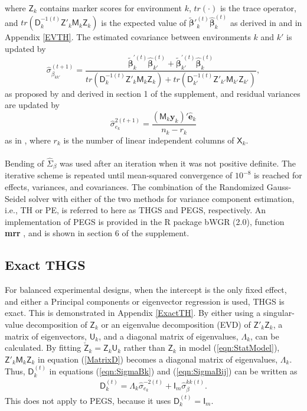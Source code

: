 \documentclass{bmcart}
\newcommand{\vecx}{\boldsymbol}
\newcommand{\mat}[1]{\boldsymbol{\mathsf{#1}}}
\begin{document}
where $\mat{Z}_k$ contains marker scores for environment $k$, $tr(\cdot)$ is the trace operator, and $tr(\mat{D}^{-1(t)}_k \mat{Z}'_k \mat{M}_{k} \mat{Z}_k)$ is the expected value of $\tilde{\vecx{\beta}}'^{(t)}_k\hat{\vecx{\beta}}^{(t)}_k$ as derived in \cite{VanRaden} and in Appendix \ref{EVTH}. The 
estimated covariance between environments $k$ and $k'$ is updated by
\begin{equation}
\label{eqn:SigmaBij}
\hat{\sigma}^{(t+1)}_{\beta_{kk'}} = \frac{\tilde{\vecx{\beta}}^{'(t)}_k\hat{\vecx{\beta}}^{(t)}_{k'} + \tilde{\vecx{\beta}}^{'(t)}_{k'}\hat{\vecx{\beta}}^{(t)}_k}{tr(\mat{D}^{-1(t)}_k \mat{Z}'_k \mat{M}_{k} \mat{Z}_k)+tr(\mat{D}^{-1(t)}_{k'} \mat{Z}'_{k'} \mat{M}_{k'} \mat{Z}_{k'})},
\end{equation}
as proposed by \cite{Schaeffer} and derived in section 1 of the supplement, and residual variances are updated by
\begin{equation}
\label{eqn:SigmaEk}
\hat{\sigma}^{2(t+1)}_{e_k} = 
\frac{(\mat{M}_{k}\vecx{y}_k)'\hat{\vecx{e}}_k}{n_k-r_k}
\end{equation}
as in \cite{GSRU}, where $r_k$ is the number of linear independent columns of $\mat{X}_k$.
\\\\
Bending  \cite{bend0} of $\hat{\Sigma}_{\beta}$ was used after an iteration when it was not positive definite. The iterative scheme is repeated until mean-squared convergence of $10^{-8}$ is reached for effects, variances, and covariances. The combination of the Randomized Gauss-Seidel solver with either of the two methods for variance component estimation, i.e., TH or PE, is referred to here as THGS and PEGS, respectively. An implementation of PEGS is provided in the R package bWGR (2.0), function \textbf{mrr} \cite{bWGR}, and is shown in section 6 of the supplement.

\subsection{Exact THGS}

For balanced experimental designs, when the intercept is the only fixed effect, and either a Principal components \cite{StatLearn} or eigenvector regression \cite{RKHS2010, svd2018, Xavier2021} is used, THGS is exact. This is demonstrated in Appendix \ref{ExactTH}. By either using a singular-value decomposition of $\mat{Z}_k$ or an eigenvalue decomposition (EVD) of $\mat{Z}'_k\mat{Z}_k$, a matrix of eigenvectors, $\mat{U}_k$, and a diagonal matrix of eigenvalues, $\mat{\Lambda}_k$, can be calculated. By fitting $\check{\mat{Z}}_k = \mat{Z}_k\mat{U}_k$  rather than $\mat{Z}_k$ in model (\ref{eqn:StatModel}), $\mat{Z}'_k\mat{M}_k\mat{Z}_k$ in equation (\ref{MatrixD})
becomes a diagonal matrix of eigenvalues, $\mat{\Lambda}_k$. Thus, $\mat{D}^{(t)}_k$ in equations (\ref{eqn:SigmaBk}) and (\ref{eqn:SigmaBij}) can be written as
\begin{align}\label{UNBIASEDTHGS}
 \mat{D}^{(t)}_k = \mat{\Lambda}_k\hat{\sigma}^{-2(t)}_{e_k}+\mat{I}_m\hat{\sigma}^{kk(t)}_{\beta}.
\end{align}
This does not apply to PEGS, because it uses $\mat{D}^{(t)}_k = \mat{I}_m$.
\end{document}

